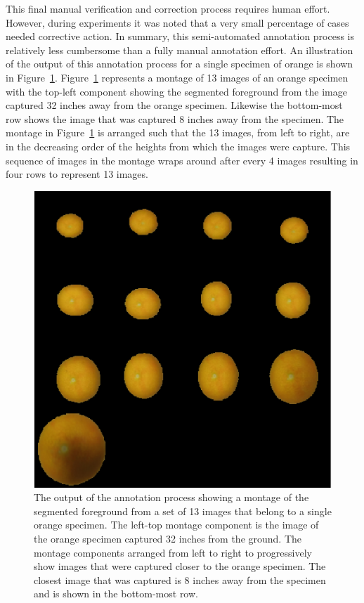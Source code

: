\documentclass {udthesis}
\begin{document}
This final manual verification and correction process requires human effort. However, during experiments it was noted that a very small percentage of cases needed corrective action. In summary, this semi-automated annotation process is relatively less cumbersome than a fully manual annotation effort. An illustration of the output of this annotation process for a single specimen of orange is shown in Figure~\ref{fig:orange_segment_height_montage}. Figure~\ref{fig:orange_segment_height_montage} represents a montage of 13 images of an orange specimen with the top-left component showing the segmented foreground from the image captured 32 inches away from the orange specimen. Likewise the bottom-most row shows the image that was captured 8 inches away from the specimen. The montage in Figure~\ref{fig:orange_segment_height_montage} is arranged such that the 13 images, from left to right, are in the decreasing order of the heights from which the images were capture. This sequence of images in the montage wraps around after 
every 4 images resulting in four rows to represent 13 images.
%
\begin{figure}
  \centering
  \includegraphics[width=\textwidth]{orange_height_segment_montage}
  \caption[Annotation output for a single specimen]{The output of the annotation process showing a montage of the segmented foreground from a set of 13 images that belong to a single orange specimen. The left-top montage component is the image of the orange specimen captured 32 inches from the ground. The montage components arranged from left to right to progressively show images that were captured closer to the orange specimen. The closest image that was captured is 8 inches away from the specimen and is shown in the bottom-most row.} 
  \label{fig:orange_segment_height_montage}
\end{figure}	
%
\end{document}
